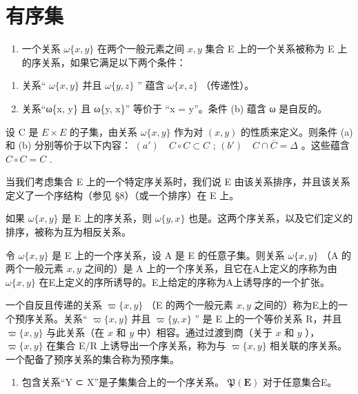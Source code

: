 \section{有序集}

\begin{enumerate}
\def\labelenumi{\arabic{enumi}.}
\tightlist
\item
  一个关系 \(\omega\{x, y\}\) 在两个一般元素之间 \(x, y\) 集合 E 上的一个关系被称为 E 上的序关系，如果它满足以下两个条件：
\end{enumerate}

\begin{enumerate}
\def\labelenumi{(\alph{enumi})}
\item
  关系“ \(\omega \{x, y\}\) 并且 \(\omega \{y, z\}\) '' 蕴含 \(\omega \{x, z\}\) （传递性）。
\item
  关系“ω\{x, y\} 且 ω\{y, x\}'' 等价于 “x = y''。条件 (b) 蕴含 ω 是自反的。
\end{enumerate}

设 C 是 \(E \times E\) 的子集，由关系 \(\omega\{x, y\}\) 作为对 \((x, y)\) 的性质来定义。则条件 (a) 和 (b) 分别等价于以下内容： \((a') \quad C \circ C \subset C\) ; \((b') \quad C \cap \overline{C} = \Delta\) 。这些蕴含 \(C \circ C = C\) .

当我们考虑集合 E 上的一个特定序关系时，我们说 E 由该关系排序，并且该关系定义了一个序结构（参见 §8）（或一个排序）在 E 上。

如果 \(\omega\{x,y\}\) 是 E 上的序关系，则 \(\omega\{y,x\}\) 也是。这两个序关系，以及它们定义的排序，被称为互为相反关系。

令 \(\omega\{x, y\}\) 是 E 上的一个序关系，设 A 是 E 的任意子集。则关系 \(\omega\{x, y\}\) （A 的两个一般元素 \(x, y\) 之间的）是 A 上的一个序关系，且它在A上定义的序称为由 \(\omega\{x, y\}\) 在E上定义的序所诱导的。E上给定的序称为A上诱导序的一个扩张。

一个自反且传递的关系 \(\varpi\{x, y\}\) （E 的两个一般元素 \(x, y\) 之间的）称为E上的一个预序关系。关系“ \(\varpi\{x, y\}\) 并且 \(\varpi\{y, x\}\) '' 是 E 上的一个等价关系 R，并且 \(\varpi\{x, y\}\) 与此关系（在 \(x\) 和 \(y\) 中）相容。通过过渡到商（关于 \(x\) 和 \(y\) ）， \(\varpi\{x, y\}\) 在集合 E/R 上诱导出一个序关系，称为与 \(\varpi\{x, y\}\) 相关联的序关系。一个配备了预序关系的集合称为预序集。

\begin{enumerate}
\def\labelenumi{\arabic{enumi}.}
\setcounter{enumi}{1}
\tightlist
\item
  包含关系“Y ⊂ X”是子集集合上的一个序关系。 \(\mathfrak{P}(\mathbf{E})\) 对于任意集合E。
\end{enumerate}

